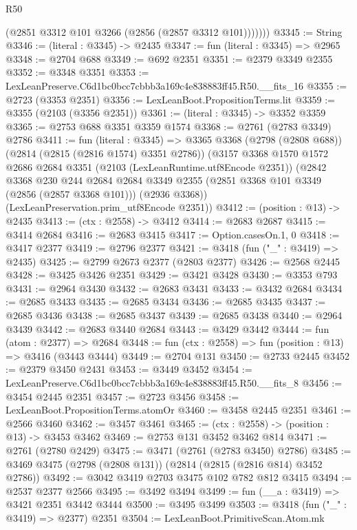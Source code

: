 \begin{lexlean}{R50}
\begin{coremodule}
            (@2851 @3312 @101 @3266 (@2856 (@2857 @3312 @101)))))))
@3345 := String
@3346 := (literal : @3345) -> @2435
@3347 := fun (literal : @3345) => @2965
@3348 := @2704 @688
@3349 := @692 @2351
@3351 := @2379 @3349 @2355
@3352 := @3348 @3351
@3353 := LexLeanPreserve.C6d1bc0bcc7cbbb3a169c4e838883ff45.R50.__fits_16
@3355 := @2723 (@3353 @2351)
@3356 := LexLeanBoot.PropositionTerms.lit
@3359 := @3355 (@2103 (@3356 @2351))
@3361 := (literal : @3345) -> @3352 @3359
@3365 := @2753 @688 @3351 @3359 @1574
@3368 := @2761 (@2783 @3349) @2786
@3411 := fun (literal : @3345) =>
  @3365
    @3368
    (@2798 (@2808 @688))
    (@2814 (@2815 (@2816 @1574) @3351 @2786))
    (@3157
      @3368
      @1570
      @1572
      @2686
      @2684
      @3351
      (@2103 (LexLeanRuntime.utf8Encode @2351))
      (@2842
        @3368
        @230
        @244
        @2684
        @2684
        @3349
        @2355
        (@2851 @3368 @101 @3349 (@2856 (@2857 @3368 @101)))
        (@2936 @3368))
      (LexLeanPreservation.prim_utf8Encode @2351))
@3412 := (position : @13) -> @2435
@3413 := (ctx : @2558) -> @3412
@3414 := @2683 @2687
@3415 := @3414 @2684
@3416 := @2683 @3415
@3417 := Option.casesOn.{1, 0}
@3418 := @3417 @2377
@3419 := @2796 @2377
@3421 := @3418 (fun ("_" : @3419) => @2435)
@3425 := @2799 @2673 @2377 (@2803 @2377)
@3426 := @2568 @2445
@3428 := @3425 @3426 @2351
@3429 := @3421 @3428
@3430 := @3353 @793
@3431 := @2964 @3430
@3432 := @2683 @3431
@3433 := @3432 @2684
@3434 := @2685 @3433
@3435 := @2685 @3434
@3436 := @2685 @3435
@3437 := @2685 @3436
@3438 := @2685 @3437
@3439 := @2685 @3438
@3440 := @2964 @3439
@3442 := @2683 @3440 @2684
@3443 := @3429 @3442
@3444 := fun (atom : @2377) => @2684
@3448 := fun (ctx : @2558) => fun (position : @13) => @3416 (@3443 @3444)
@3449 := @2704 @131
@3450 := @2733 @2445
@3452 := @2379 @3450 @2431
@3453 := @3449 @3452
@3454 := LexLeanPreserve.C6d1bc0bcc7cbbb3a169c4e838883ff45.R50.__fits_8
@3456 := @3454 @2445 @2351
@3457 := @2723 @3456
@3458 := LexLeanBoot.PropositionTerms.atomOr
@3460 := @3458 @2445 @2351
@3461 := @2566 @3460
@3462 := @3457 @3461
@3465 := (ctx : @2558) -> (position : @13) -> @3453 @3462
@3469 := @2753 @131 @3452 @3462 @814
@3471 := @2761 (@2780 @2429)
@3475 := @3471 (@2761 (@2783 @3450) @2786)
@3485 := @3469 @3475 (@2798 (@2808 @131)) (@2814 (@2815 (@2816 @814) @3452 @2786))
@3492 := @3042 @3419 @2703 @3475 @102 @782 @812 @3415
@3494 := @2537 @2377 @2566
@3495 := @3492 @3494
@3499 := fun (__a : @3419) => @3421 @2351 @3442 @3444
@3500 := @3495 @3499
@3503 := @3418 (fun ("_" : @3419) => @2377) @2351
@3504 := LexLeanBoot.PrimitiveScan.Atom.mk

\end{coremodule}
\end{lexlean}

